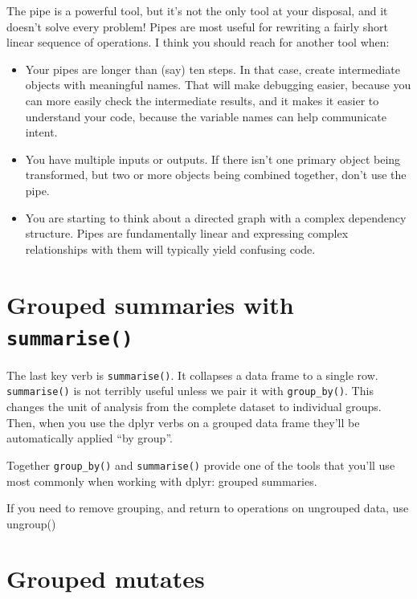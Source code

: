 \documentclass[]{book}
\providecommand{\tightlist}{%
  \setlength{\itemsep}{0pt}\setlength{\parskip}{0pt}}
\theoremstyle{definition}
\theoremstyle{definition}
\theoremstyle{definition}
\theoremstyle{remark}
\let\BeginKnitrBlock\begin \let\EndKnitrBlock\end
\begin{document}
The pipe is a powerful tool, but it's not the only tool at your
disposal, and it doesn't solve every problem! Pipes are most useful for
rewriting a fairly short linear sequence of operations. I think you
should reach for another tool when:

\begin{itemize}
\tightlist
\item
  Your pipes are longer than (say) ten steps. In that case, create
  intermediate objects with meaningful names. That will make debugging
  easier, because you can more easily check the intermediate results,
  and it makes it easier to understand your code, because the variable
  names can help communicate intent.
\item
  You have multiple inputs or outputs. If there isn't one primary object
  being transformed, but two or more objects being combined together,
  don't use the pipe.
\item
  You are starting to think about a directed graph with a complex
  dependency structure. Pipes are fundamentally linear and expressing
  complex relationships with them will typically yield confusing code.
\end{itemize}

\hypertarget{grouped-summaries-with-summarise}{%
\section{\texorpdfstring{Grouped summaries with
\texttt{summarise()}}{Grouped summaries with summarise()}}\label{grouped-summaries-with-summarise}}

The last key verb is \texttt{summarise()}. It collapses a data frame to
a single row. \texttt{summarise()} is not terribly useful unless we pair
it with \texttt{group\_by()}. This changes the unit of analysis from the
complete dataset to individual groups. Then, when you use the dplyr
verbs on a grouped data frame they'll be automatically applied ``by
group''.

Together \texttt{group\_by()} and \texttt{summarise()} provide one of
the tools that you'll use most commonly when working with dplyr: grouped
summaries.

\BeginKnitrBlock{rmdimportant}
If you need to remove grouping, and return to operations on ungrouped
data, use ungroup()
\EndKnitrBlock{rmdimportant}

\hypertarget{grouped-mutates}{%
\section{Grouped mutates}\label{grouped-mutates}}
\end{document}
